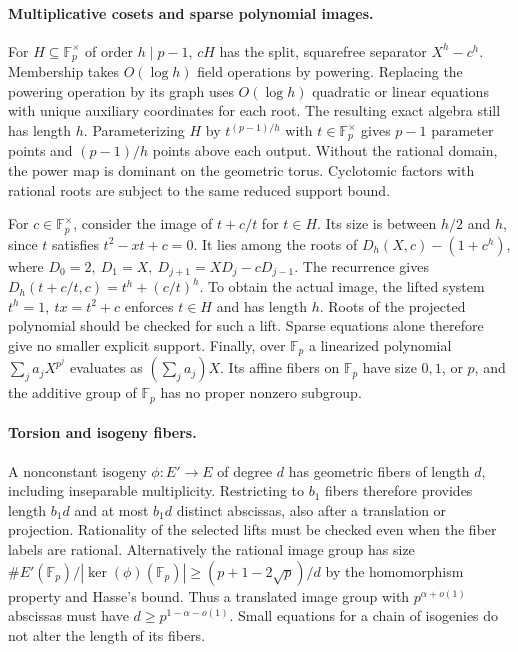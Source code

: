 \documentclass[11pt]{article}
\newcommand{\Fp}{\mathbb F_p}
\begin{document}
\paragraph{Multiplicative cosets and sparse polynomial images.}
For \(H\subseteq\Fp^\times\) of order \(h\mid p-1\), \(cH\) has the split, squarefree separator \(X^h-c^h\). Membership takes \(O(\log h)\) field operations by powering. Replacing the powering operation by its graph uses \(O(\log h)\) quadratic or linear equations with unique auxiliary coordinates for each root. The resulting exact algebra still has length \(h\). Parameterizing \(H\) by \(t^{(p-1)/h}\) with \(t\in\Fp^\times\) gives \(p-1\) parameter points and \((p-1)/h\) points above each output. Without the rational domain, the power map is dominant on the geometric torus. Cyclotomic factors with rational roots are subject to the same reduced support bound.

For \(c\in\Fp^\times\), consider the image of \(t+c/t\) for \(t\in H\). Its size is between \(h/2\) and \(h\), since \(t\) satisfies \(t^2-xt+c=0\). It lies among the roots of \(D_h(X,c)-(1+c^h)\), where \(D_0=2,\ D_1=X,\ D_{j+1}=XD_j-cD_{j-1}\). The recurrence gives \(D_h(t+c/t,c)=t^h+(c/t)^h\). To obtain the actual image, the lifted system \(t^h=1,\ tx=t^2+c\) enforces \(t\in H\) and has length \(h\). Roots of the projected polynomial should be checked for such a lift. Sparse equations alone therefore give no smaller explicit support. Finally, over \(\Fp\) a linearized polynomial \(\sum_j a_jX^{p^j}\) evaluates as \((\sum_j a_j)X\). Its affine fibers on \(\Fp\) have size \(0,1\), or \(p\), and the additive group of \(\Fp\) has no proper nonzero subgroup.

\paragraph{Torsion and isogeny fibers.}
A nonconstant isogeny \(\phi:E'\to E\) of degree \(d\) has geometric fibers of length \(d\), including inseparable multiplicity. Restricting to \(b_1\) fibers therefore provides length \(b_1d\) and at most \(b_1d\) distinct abscissas, also after a translation or projection. Rationality of the selected lifts must be checked even when the fiber labels are rational. Alternatively the rational image group has size \(\#E'(\Fp)/|\ker(\phi)(\Fp)|\ge (p+1-2\sqrt p)/d\) by the homomorphism property and Hasse's bound. Thus a translated image group with \(p^{\alpha+o(1)}\) abscissas must have \(d\ge p^{1-\alpha-o(1)}\). Small equations for a chain of isogenies do not alter the length of its fibers.
\end{document}
